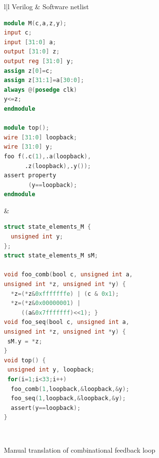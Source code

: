 \begin{figure}[htbp]
\scriptsize
\begin{tabular}{l|l}
\hline
Verilog & Software netlist \\
\hline
\begin{lstlisting}[mathescape=true,language=Verilog]
module M(c,a,z,y);
input c;
input [31:0] a;
output [31:0] z;
output reg [31:0] y;
assign z[0]=c;
assign z[31:1]=a[30:0];
always @(posedge clk)
y<=z;
endmodule

module top();
wire [31:0] loopback;
wire [31:0] y;
foo f(.c(1),.a(loopback),
      .z(loopback),.y());
assert property 
       (y==loopback); 
endmodule 
\end{lstlisting}
&
\begin{lstlisting}[mathescape=true,language=C]
struct state_elements_M {
  unsigned int y;
};
struct state_elements_M sM;

void foo_comb(bool c, unsigned int a,
unsigned int *z, unsigned int *y) {
  *z=(*z&0xfffffffe) | (c & 0x1);
  *z=(*z&0x00000001) | 
     ((a&0x7fffffff)<<1); }
void foo_seq(bool c, unsigned int a,
unsigned int *z, unsigned int *y) {
 sM.y = *z;
}
void top() {
 unsigned int y, loopback;
 for(i=1;i<33;i++)
  foo_comb(1,loopback,&loopback,&y);
  foo_seq(1,loopback,&loopback,&y);
  assert(y==loopback); 
}
\end{lstlisting}
\\
\hline
\end{tabular}
\caption{Manual translation of combinational feedback loop}
\label{figure:comb-loop}
\end{figure}
%

